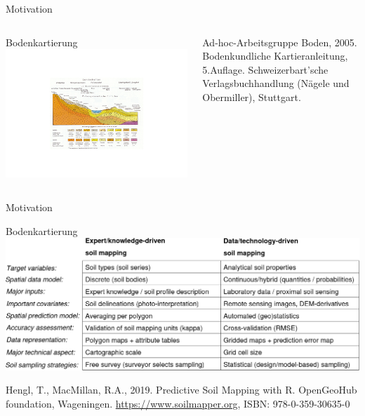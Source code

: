 

\begin{frame}{Motivation}
\begin{columns}
\column{8.5cm}
\begin{block}{Bodenkartierung}
\centering\includegraphics[width=1\textwidth]{FIGURE/Scan_20230923_203922.pdf}
 \end{block}
 \column{2.5cm}
\raggedright\tiny Ad-hoc-Arbeitsgruppe Boden, 2005. Bodenkundliche Kartieranleitung, 5.Auflage. Schweizerbart’sche Verlagsbuchhandlung (Nägele und Obermiller), Stuttgart.
\end{columns}
\end{frame}






\begin{frame}{Motivation}

 \begin{block}{Bodenkartierung}
\centering\includegraphics[width=1\textwidth]{FIGURE/SoilMapping.png}
\end{block}
\raggedright\tiny 
Hengl, T., MacMillan, R.A., 2019. Predictive Soil Mapping with R. OpenGeoHub foundation, Wageningen.
\url{https://www.soilmapper.org}, ISBN: 978-0-359-30635-0     
\end{frame}

